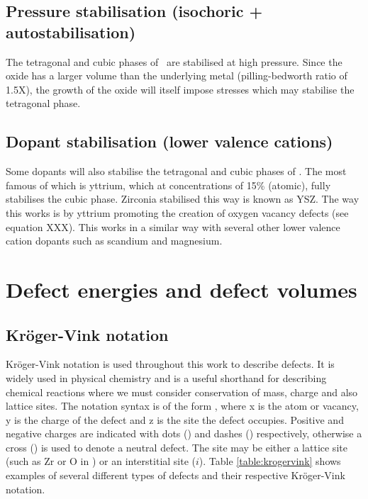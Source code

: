 \subsection{Pressure stabilisation (isochoric + autostabilisation)}

The tetragonal and cubic phases of \zirconia\ are stabilised at high pressure. Since the oxide has a larger volume than the underlying metal (pilling-bedworth ratio of 1.5X), the growth of the oxide will itself impose stresses which may stabilise the tetragonal phase.

\subsection{Dopant stabilisation (lower valence cations)}

Some dopants will also stabilise the tetragonal and cubic phases of \zirconia. The most famous of which is yttrium, which at concentrations of 15\% (atomic), fully stabilises the cubic phase. Zirconia stabilised this way is known as YSZ. The way this works is by yttrium promoting the creation of oxygen vacancy defects (see equation XXX). This works in a similar way with several other lower valence cation dopants such as scandium and magnesium.

\section{Defect energies and defect volumes}

\subsection{Kr\"{o}ger-Vink notation}

Kr\"{o}ger-Vink notation \cite{kroger1956relations} is used throughout this work to describe defects. It is widely used in physical chemistry and is a useful shorthand for describing chemical reactions where we must consider conservation of mass, charge and also lattice sites. The notation syntax is of the form , where x is the atom or vacancy, y is the charge of the defect and z is the site the defect occupies. Positive and negative charges are indicated with dots (\ch{^{*}}) and dashes () respectively, otherwise a cross () is used to denote a neutral defect. The site may be either a lattice site (such as Zr or O in \zirconia ) or an interstitial site ($i$). Table \ref{table:krogervink} shows examples of several different types of defects and their respective Kr\"{o}ger-Vink notation.

